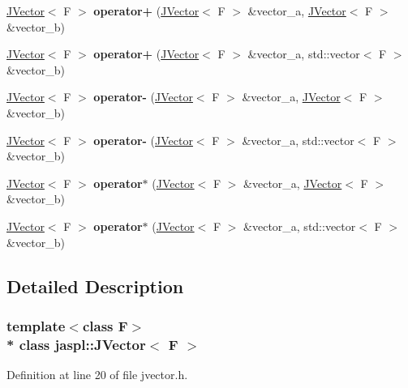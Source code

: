 \begin{DoxyCompactItemize}
\item 
\hyperlink{classjaspl_1_1_j_vector}{J\+Vector}$<$ F $>$ {\bfseries operator+} (\hyperlink{classjaspl_1_1_j_vector}{J\+Vector}$<$ F $>$ \&vector\+\_\+a, \hyperlink{classjaspl_1_1_j_vector}{J\+Vector}$<$ F $>$ \&vector\+\_\+b)\hypertarget{classjaspl_1_1_j_vector_ab0c3db97c64f145b82254682de3a9dac}{}\label{classjaspl_1_1_j_vector_ab0c3db97c64f145b82254682de3a9dac}

\item 
\hyperlink{classjaspl_1_1_j_vector}{J\+Vector}$<$ F $>$ {\bfseries operator+} (\hyperlink{classjaspl_1_1_j_vector}{J\+Vector}$<$ F $>$ \&vector\+\_\+a, std\+::vector$<$ F $>$ \&vector\+\_\+b)\hypertarget{classjaspl_1_1_j_vector_a2d32b7256486f2427723aa03d2e21016}{}\label{classjaspl_1_1_j_vector_a2d32b7256486f2427723aa03d2e21016}

\item 
\hyperlink{classjaspl_1_1_j_vector}{J\+Vector}$<$ F $>$ {\bfseries operator-\/} (\hyperlink{classjaspl_1_1_j_vector}{J\+Vector}$<$ F $>$ \&vector\+\_\+a, \hyperlink{classjaspl_1_1_j_vector}{J\+Vector}$<$ F $>$ \&vector\+\_\+b)\hypertarget{classjaspl_1_1_j_vector_a0346f9409f8dbf1c202a587bd4be6e6d}{}\label{classjaspl_1_1_j_vector_a0346f9409f8dbf1c202a587bd4be6e6d}

\item 
\hyperlink{classjaspl_1_1_j_vector}{J\+Vector}$<$ F $>$ {\bfseries operator-\/} (\hyperlink{classjaspl_1_1_j_vector}{J\+Vector}$<$ F $>$ \&vector\+\_\+a, std\+::vector$<$ F $>$ \&vector\+\_\+b)\hypertarget{classjaspl_1_1_j_vector_ae6badaa441ef27ab6140d8dcec31eae8}{}\label{classjaspl_1_1_j_vector_ae6badaa441ef27ab6140d8dcec31eae8}

\item 
\hyperlink{classjaspl_1_1_j_vector}{J\+Vector}$<$ F $>$ {\bfseries operator$\ast$} (\hyperlink{classjaspl_1_1_j_vector}{J\+Vector}$<$ F $>$ \&vector\+\_\+a, \hyperlink{classjaspl_1_1_j_vector}{J\+Vector}$<$ F $>$ \&vector\+\_\+b)\hypertarget{classjaspl_1_1_j_vector_a2c5ea5529b0e58fd7cca8431b618d909}{}\label{classjaspl_1_1_j_vector_a2c5ea5529b0e58fd7cca8431b618d909}

\item 
\hyperlink{classjaspl_1_1_j_vector}{J\+Vector}$<$ F $>$ {\bfseries operator$\ast$} (\hyperlink{classjaspl_1_1_j_vector}{J\+Vector}$<$ F $>$ \&vector\+\_\+a, std\+::vector$<$ F $>$ \&vector\+\_\+b)\hypertarget{classjaspl_1_1_j_vector_a357e9f8d65a0e055329173fc96a269dc}{}\label{classjaspl_1_1_j_vector_a357e9f8d65a0e055329173fc96a269dc}

\end{DoxyCompactItemize}


\subsection{Detailed Description}
\subsubsection*{template$<$class F$>$\\*
class jaspl\+::\+J\+Vector$<$ F $>$}



Definition at line 20 of file jvector.\+h.

